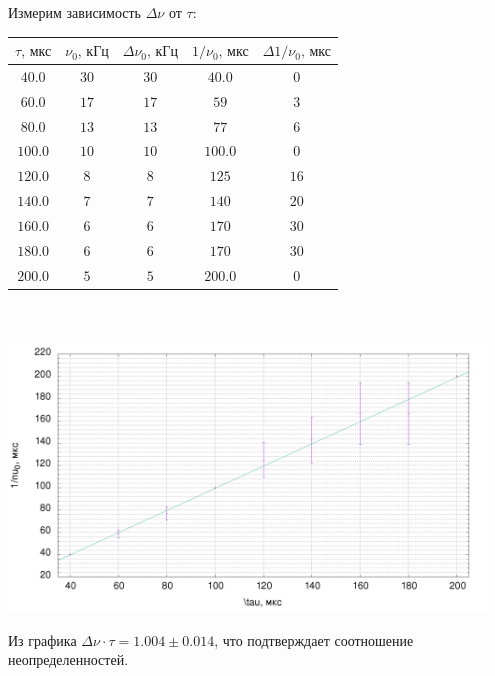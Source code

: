 \documentclass[a4paper, 12pt]{article}%
\begin{document}
Измерим зависимость $\Delta \nu$ от $\tau$:
\begin{center}
\begin{tabular}{|c|c|c|c|c|}\hline
$\tau\text{, мкс}$&$\nu_0\text{, кГц}$&$\Delta \nu_0\text{, кГц}$&$1/\nu_0\text{, мкс}$&$\Delta 1/\nu_0\text{, мкс}$\\\hline
$40.0$&$30$&$30$&$40.0$&$0$\\\hline
$60.0$&$17$&$17$&$59$&$3$\\\hline
$80.0$&$13$&$13$&$77$&$6$\\\hline
$100.0$&$10$&$10$&$100.0$&$0$\\\hline
$120.0$&$8$&$8$&$125$&$16$\\\hline
$140.0$&$7$&$7$&$140$&$20$\\\hline
$160.0$&$6$&$6$&$170$&$30$\\\hline
$180.0$&$6$&$6$&$170$&$30$\\\hline
$200.0$&$5$&$5$&$200.0$&$0$\\\hline
\end{tabular}\\~\\
\includegraphics[width=0.95\textwidth]{./res/data.png}
\end{center}

Из графика $\Delta \nu \cdot \tau = 1.004\pm0.014$, что подтверждает соотношение неопределенностей.
\end{document}
